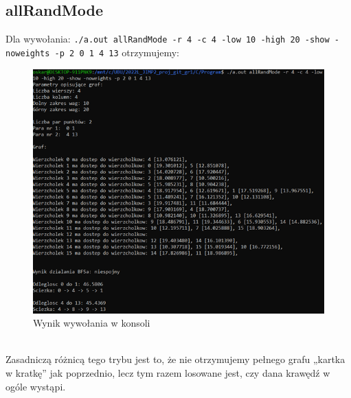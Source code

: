 \documentclass{article}
\begin{document}
\subsection{allRandMode}
Dla wywołania: \texttt{./a.out allRandMode -r 4 -c 4 -low 10 -high 20 -show -noweights -p 2 0 1 4 13} otrzymujemy: \\
 \begin{figure}[h]
\centering
\includegraphics[width=1\textwidth]{obraz3.png}
\caption{\label{fig:mod}Wynik wywołania w konsoli}
\end{figure}
\\ Zasadniczą różnicą tego trybu jest to, że nie otrzymujemy pełnego grafu „kartka w kratkę” jak poprzednio, lecz tym razem losowane jest, czy dana krawędź w ogóle wystąpi. \pagebreak
\end{document}
